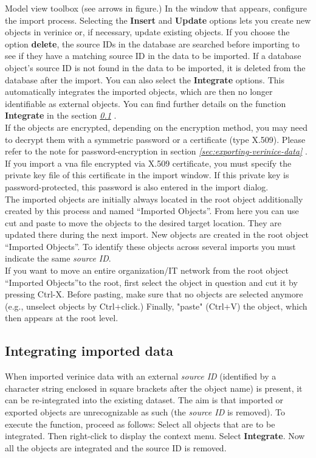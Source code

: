 \documentclass[a4paper,10pt]{book}
\begin{document}
Model view toolbox (see arrows in figure.) In the window that appears, configure the import process. Selecting the
\textbf{Insert} and \textbf{Update} options lets you create new objects in verinice or, if necessary, update existing objects.
If you choose the option \textbf{delete}, the source IDs in the database are searched before importing to see if they have a matching source ID in the data to be imported.
If a database object’s source ID is not found in the data to be imported, it is deleted from the database after the import.
You can also select the \textbf{Integrate} options. This automatically integrates the imported objects, which are then no longer
identifiable as external objects. You can find further details on the function \textbf{Integrate} in the section {\em \ref{Integrating imported data} }.
\newline\\
If the objects are encrypted, depending on the encryption method, you may need to decrypt them with a symmetric password or a certificate
(type X.509). Please refer to the note for password-encryption in section {\em
\ref{sec:exporting-verinice-data} }. If
you import a vna file encrypted via X.509 certificate, you must specify the
private key file of this certificate in the import window. If this private key
is password-protected, this password is also entered in the import dialog.
\newline\\
The imported objects are initially always located in the root object additionally created by this process and named
``Imported Objects''. From here you can use cut and paste to move the objects to the desired target location. They are
updated there during the next import. New objects are created in the root object ``Imported Objects''. To identify these objects across several
imports you must indicate the same \textit{source ID}.
\newline\\
If you want to move an entire organization/IT network from the root object ``Imported Objects''to the root, first select the object in
question and cut it by pressing Ctrl-X. Before pasting, make sure that no objects are selected anymore (e.g.,
unselect objects by Ctrl+click.) Finally, "paste" (Ctrl+V) the object, which then appears at the root level.

\subsection{Integrating imported data} \label{Integrating imported data}
When imported verinice data with an external \textit{source ID} (identified by a character string enclosed in square brackets after the object name) is present, it can be re-integrated into the existing dataset.
The aim is that imported or exported objects are unrecognizable as such (the \textit{source ID} is removed).  To execute the function, proceed as follows: Select all objects that are to be integrated. Then right-click to display the context menu.
Select \textbf{Integrate}. Now all the objects are integrated and the source ID is removed.
\end{document}
